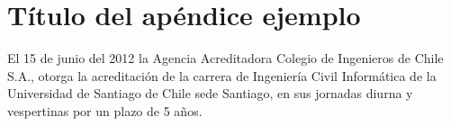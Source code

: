 \chapter{Título del apéndice ejemplo}
\label{finales:apendice1}
El 15 de junio del 2012 la Agencia Acreditadora Colegio de Ingenieros de Chile S.A., otorga la acreditación de la carrera de Ingeniería Civil Informática de la Universidad de Santiago de Chile sede Santiago, en sus jornadas diurna y vespertinas por un plazo de 5 años.